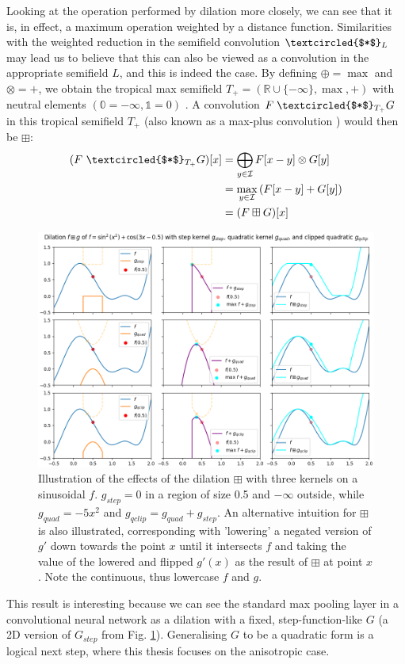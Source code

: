\documentclass[a4paper, 12pt]{report}
\begin{document}
Looking at the operation performed by dilation more closely, we can see that it is, in effect, a maximum operation weighted by a distance function. Similarities with the weighted reduction in the semifield convolution $\textcircled{$*$}_L$ may lead us to believe that this can also be viewed as a convolution in the appropriate semifield $L$, and this is indeed the case. By defining $\oplus=\max$ and $\otimes=+$, we obtain the tropical max semifield $T_+=(\mathbb{R}\cup\{-\infty\},\max,+)$ with neutral elements $(\mathbb{0}=-\infty, \mathbb{1}=0)$ \cite{maragos, bellaardaxiomatic}. A convolution $F \;\textcircled{$*$}_{T_+} G$ in this tropical semifield $T_+$ (also known as a max-plus convolution \cite{maragos}) would then be $\boxplus$:
\begin{align*}
	(F ~\textcircled{$*$}_{T_+} G)[x]
	&= \bigoplus_{y\in \mathcal{I}}F[x-y] \otimes G[y] \\
	&= \max_{y\in \mathcal{I}}\left(F[x-y] + G[y]\right) \\
	&= (F \boxplus G)[x]
\end{align*}

\begin{figure}[h!]
  \includegraphics[width=\textwidth]{figures/dilation_illustration.png}
  \caption{Illustration of the effects of the dilation $\boxplus$ with three kernels on a sinusoidal $f$. $g_{step}=0$ in a region of size 0.5 and $-\infty$ outside, while $g_{quad}=-5x^2$ and $g_{qclip}=g_{quad}+g_{step}$. An alternative intuition for $\boxplus$ is also illustrated, corresponding with 'lowering' a negated version of $g'$ down towards the point $x$ until it intersects $f$ and taking the value of the lowered and flipped $g'(x)$ as the result of $\boxplus$ at point $x$. Note the continuous, thus lowercase $f$ and $g$.}
  \label{fig:dil-illust}
\end{figure}
\noindent
This result is interesting because we can see the standard max pooling layer in a convolutional neural network as a dilation with a fixed, step-function-like $G$ (a 2D version of $G_{step}$ from Fig. \ref{fig:dil-illust}). Generalising $G$ to be a quadratic form is a logical next step, where this thesis focuses on the anisotropic case.
\end{document}

